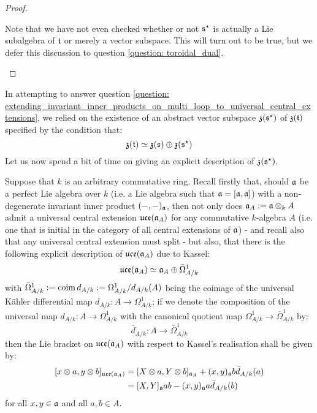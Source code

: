 \begin{proof}
\begin{enumerate}
                        Note that we have not even checked whether or not $\mathfrak{s}^{\star}$ is actually a Lie subalgebra of $\mathfrak{t}$ or merely a vector subspace. This will turn out to be true, but we defer this discussion to question \ref{question: toroidal_dual}. 
                    \end{enumerate}
                \end{proof}
            \begin{remark} \label{remark: centres_of_dual_toroidal_lie_bialgebras}
                In attempting to answer question \ref{question: extending_invariant_inner_products_on_multi_loop_to_universal_central_extensions}, we relied on the existence of an abstract vector subspace $\mathfrak{z}(\mathfrak{s}^{\star})$ of $\mathfrak{z}(\mathfrak{t})$ specified by the condition that:
                    $$\mathfrak{z}(\mathfrak{t}) \simeq \mathfrak{z}(\mathfrak{s}) \oplus \mathfrak{z}(\mathfrak{s}^{\star})$$
                Let us now spend a bit of time on giving an explicit description of $\mathfrak{z}(\mathfrak{s}^{\star})$. 

                Suppose that $k$ is an arbitrary commutative ring. Recall firstly that, should $\mathfrak{a}$ be a perfect Lie algebra over $k$ (i.e. a Lie algebra such that $\mathfrak{a} = [\mathfrak{a}, \mathfrak{a}]$) with a non-degenerate invariant inner product $(-, -)_{\mathfrak{a}}$, then not only does $\a_A := \a \tensor_k A$ admit a universal central extension $\mathfrak{uce}(\mathfrak{a}_A)$ for any commutative $k$-algebra $A$ (i.e. one that is initial in the category of all central extensions of $\mathfrak{a}$) - and recall also that any universal central extension must split - but also, that there is the following explicit description of $\mathfrak{uce}(\mathfrak{a}_A)$ due to Kassel:
                    $$\mathfrak{uce}(\mathfrak{a}_A) \simeq \mathfrak{a}_A \oplus \bar{\Omega}^1_{A/k}$$
                with $\bar{\Omega}^1_{A/k} := \operatorname{coim} d_{A/k} := \Omega^1_{A/k}/d_{A/k}(A)$ being the coimage of the universal K\"ahler differential map $d_{A/k}: A \to \Omega^1_{A/k}$; if we denote the composition of the universal map $d_{A/k}: A \to \Omega^1_{A/k}$ with the canonical quotient map $\Omega^1_{A/k} \to \bar{\Omega}^1_{A/k}$ by:
                    $$\bar{d}_{A/k}: A \to \bar{\Omega}^1_{A/k}$$
                then the Lie bracket on $\mathfrak{uce}(\mathfrak{a}_A)$ with respect to Kassel's realisation shall be given by:
                    $$
                        \begin{aligned}
                            [ x \tensor a, y \tensor b ]_{\uce(\a_A)} & = [ X \tensor a, Y \tensor b ]_{\a_A} + (x, y)_{\a} b \bar{d}_{A/k}(a)
                            \\
                            & = [X, Y]_{\a} ab - (x, y)_{\a} a \bar{d}_{A/k}(b)
                        \end{aligned}
                    $$
                for all $x, y \in \mathfrak{a}$ and all $a, b \in A$.
                    

\end{remark}
